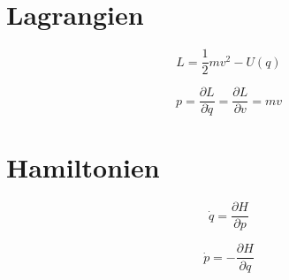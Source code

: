 \documentclass{article}
\begin{document}
\section{Lagrangien}

$$
    L = \frac{1}{2} m v^2 - U(q)
$$

$$
    p = \frac{\partial L}{\partial \dot q}
    = \frac{\partial L}{\partial v}
    = mv
$$

\section{Hamiltonien}

$$
    \dot q = \frac{\partial H}{\partial p}
$$

$$
    \dot p = - \frac{\partial H}{\partial q}
$$
\end{document}
